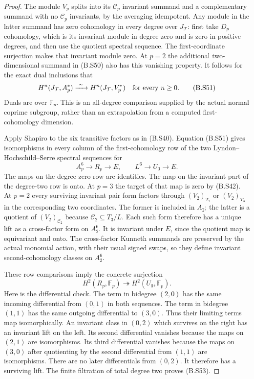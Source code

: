 \begin{proof}
The module $V_p$ splits into its $\mathcal C_p$ invariant
summand and a complementary summand with no $\mathcal C_p$
invariants, by the averaging idempotent.
Any module in the latter summand has zero cohomology
in every degree over $J_{\mathcal T}$: first take
$D_p$ cohomology, which is its invariant module in
degree zero and is zero in positive degrees, and
then use the quotient spectral sequence.  The
first-coordinate surjection makes that invariant
module zero.  At $p=2$ the additional two-dimensional
summand in (B.S50) also has this vanishing property.
It follows for the exact dual inclusions that
\[
 H^n(J_{\mathcal T},A_p^*)
             \xrightarrow{\ \sim\ }
 H^n(J_{\mathcal T},V_p^*)
                \quad\hbox{for every }n\geq0.                 \tag{B.S51}
\]
Duals are over $\mathbb F_p$.  This is an all-degree
comparison supplied by the actual normal coprime
subgroup, rather than an extrapolation from a
computed first-cohomology dimension.

Apply Shapiro to the six transitive factors as in
(B.S40).  Equation (B.S51) gives isomorphisms in
every column of the first-cohomology row of the
two Lyndon--Hochschild--Serre spectral sequences
for
\[
 A_p^6\longrightarrow R_p\longrightarrow E,
       \qquad L^6\longrightarrow U_0\longrightarrow E.
                                                                  \tag{B.S52}
\]
The maps on the degree-zero row are identities.
The map on the invariant part of the degree-two
row is onto.  At $p=3$ the target of that map is
zero by (B.S42).  At $p=2$ every surviving invariant
pair form factors through $(V_2)_{T_2}$ or
$(V_2)_{T_3}$ in the corresponding two coordinates.
The former is included in $A_2$; the latter is a
quotient of $(V_2)_{\mathcal C_2}$ because
$\mathcal C_2\subseteq T_3/L$.  Each such form therefore
has a unique lift as a cross-factor form on $A_2^6$.
It is invariant under $E$, since the quotient map
is equivariant and onto.  The cross-factor Kunneth
summands are preserved by the actual monomial
action, with their usual signed swaps, so they
define invariant second-cohomology classes on
$A_2^6$.

These row comparisons imply the concrete surjection
\[
 H^2(R_p,\mathbb F_p)
                   \twoheadrightarrow H^2(U_0,\mathbb F_p).
                                                                  \tag{B.S53}
\]
Here is the differential check.  The term in bidegree
$(2,0)$ has the same incoming differential from
$(0,1)$ in both sequences.  The term in bidegree
$(1,1)$ has the same outgoing differential to
$(3,0)$.  Thus their limiting terms map
isomorphically.  An invariant class in $(0,2)$
which survives on the right has an invariant lift
on the left.  Its second differential vanishes
because the maps on $(2,1)$ are isomorphisms.
Its third differential vanishes because the maps
on $(3,0)$ after quotienting by the second
differential from $(1,1)$ are isomorphisms.
There are no later differentials from $(0,2)$.
It therefore has a surviving lift.  The finite
filtration of total degree two proves (B.S53).


\end{proof}
